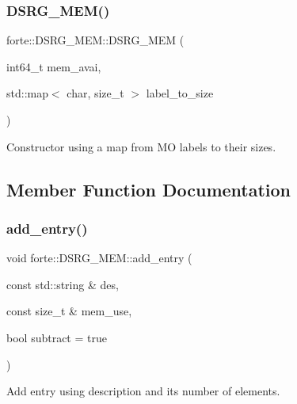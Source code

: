 \subsubsection{\texorpdfstring{D\+S\+R\+G\+\_\+\+M\+E\+M()}{DSRG\_MEM()}\hspace{0.1cm}{\footnotesize\ttfamily [2/2]}}
{\footnotesize\ttfamily forte\+::\+D\+S\+R\+G\+\_\+\+M\+E\+M\+::\+D\+S\+R\+G\+\_\+\+M\+EM (\begin{DoxyParamCaption}\item[{int64\+\_\+t}]{mem\+\_\+avai,  }\item[{std\+::map$<$ char, size\+\_\+t $>$}]{label\+\_\+to\+\_\+size }\end{DoxyParamCaption})}



Constructor using a map from MO labels to their sizes. 



\subsection{Member Function Documentation}
\mbox{\label{classforte_1_1_d_s_r_g___m_e_m_ad985484ea1139ca02fe50024656a9a11}} 
\subsubsection{\texorpdfstring{add\+\_\+entry()}{add\_entry()}\hspace{0.1cm}{\footnotesize\ttfamily [1/2]}}
{\footnotesize\ttfamily void forte\+::\+D\+S\+R\+G\+\_\+\+M\+E\+M\+::add\+\_\+entry (\begin{DoxyParamCaption}\item[{const std\+::string \&}]{des,  }\item[{const size\+\_\+t \&}]{mem\+\_\+use,  }\item[{bool}]{subtract = {\ttfamily true} }\end{DoxyParamCaption})}



Add entry using description and its number of elements. 

\mbox{\label{classforte_1_1_d_s_r_g___m_e_m_aa970ba2e3f8577ad44aa32f8d84fe80e}} 

